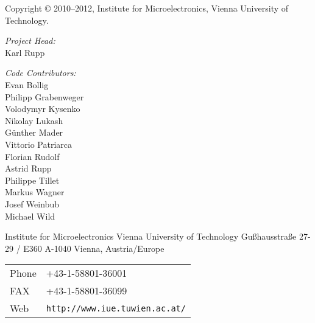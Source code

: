 
\clearpage

Copyright {\copyright} 2010--2012, Institute for Microelectronics, Vienna University of Technology.

\vspace{2.cm}

\textit{Project Head:}\\ 

Karl Rupp\\

\vspace{2.cm}

\textit{Code Contributors:} \\

Evan Bollig \\
Philipp Grabenweger \\
Volodymyr Kysenko \\
Nikolay Lukash \\
G\"unther Mader \\
Vittorio Patriarca \\
Florian Rudolf \\
Astrid Rupp \\
Philippe Tillet \\
Markus Wagner \\
Josef Weinbub \\
Michael Wild \\



\vspace{4.0cm}

Institute for Microelectronics\newline
Vienna University of Technology\newline
Gu\ss hausstra\ss e 27-29 / E360\newline
A-1040 Vienna, Austria/Europe\newline


\begin{tabular}{ll}
Phone  & +43-1-58801-36001\\
FAX    & +43-1-58801-36099\\
Web    & \texttt{http://www.iue.tuwien.ac.at/}
\end{tabular}



